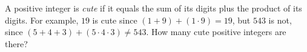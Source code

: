 A positive integer is \emph{cute} if it equals the sum of its digits plus the product of its digits. For example, $19$ is cute since $(1+9)+(1\cdot9)=19$, but $543$ is not, since $(5+4+3)+(5\cdot4\cdot3)\ne543$. How many cute positive integers are there?
